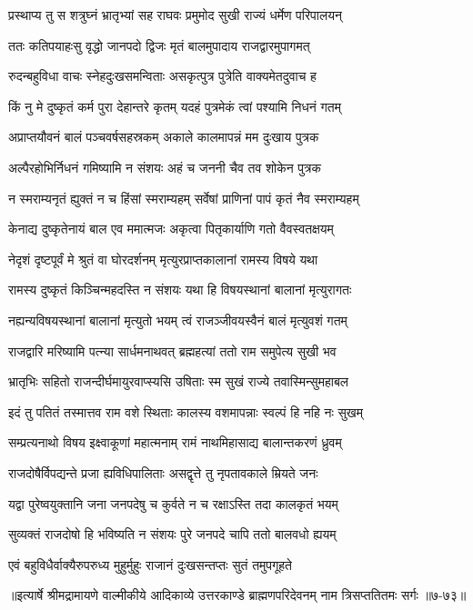 
\twolineshloka
{प्रस्थाप्य तु स शत्रुघ्नं भ्रातृभ्यां सह राघवः}
{प्रमुमोद सुखी राज्यं धर्मेण परिपालयन्} %

\twolineshloka
{ततः कतिपयाहःसु वृद्धो जानपदो द्विजः}
{मृतं बालमुपादाय राजद्वारमुपागमत्} %

\twolineshloka
{रुदन्बहुविधा वाचः स्नेहदुःखसमन्विताः}
{असकृत्पुत्र पुत्रेति वाक्यमेतदुवाच ह} %

\twolineshloka
{किं नु मे दुष्कृतं कर्म पुरा देहान्तरे कृतम्}
{यदहं पुत्रमेकं त्वां पश्यामि निधनं गतम्} %

\twolineshloka
{अप्राप्तयौवनं बालं पञ्चवर्षसहस्रकम्}
{अकाले कालमापन्नं मम दुःखाय पुत्रक} %

\twolineshloka
{अल्पैरहोभिर्निधनं गमिष्यामि न संशयः}
{अहं च जननी चैव तव शोकेन पुत्रक} %

\twolineshloka
{न स्मराम्यनृतं ह्युक्तं न च हिंसां स्मराम्यहम्}
{सर्वेषां प्राणिनां पापं कृतं नैव स्मराम्यहम्} %

\twolineshloka
{केनाद्य दुष्कृतेनायं बाल एव ममात्मजः}
{अकृत्वा पितृकार्याणि गतो वैवस्वतक्षयम्} %

\twolineshloka
{नेदृशं दृष्टपूर्वं मे श्रुतं वा घोरदर्शनम्}
{मृत्युरप्राप्तकालानां रामस्य विषये यथा} %

\twolineshloka
{रामस्य दुष्कृतं किञ्चिन्महदस्ति न संशयः}
{यथा हि विषयस्थानां बालानां मृत्युरागतः} %

\twolineshloka
{नह्यन्यविषयस्थानां बालानां मृत्युतो भयम्}
{त्वं राजञ्जीवयस्वैनं बालं मृत्युवशं गतम्} %

\twolineshloka
{राजद्वारि मरिष्यामि पत्न्या सार्धमनाथवत्}
{ब्रह्महत्यां ततो राम समुपेत्य सुखी भव} %

\twolineshloka
{भ्रातृभिः सहितो राजन्दीर्घमायुरवाप्स्यसि}
{उषिताः स्म सुखं राज्ये तवास्मिन्सुमहाबल} %

\twolineshloka
{इदं तु पतितं तस्मात्तव राम वशे स्थिताः}
{कालस्य वशमापन्नाः स्वल्पं हि नहि नः सुखम्} %

\twolineshloka
{सम्प्रत्यनाथो विषय इक्ष्वाकूणां महात्मनाम्}
{रामं नाथमिहासाद्य बालान्तकरणं ध्रुवम्} %

\twolineshloka
{राजदोषैर्विपद्यन्ते प्रजा ह्यविधिपालिताः}
{असद्वृत्ते तु नृपतावकाले म्रियते जनः} %

\twolineshloka
{यद्वा पुरेष्वयुक्तानि जना जनपदेषु च}
{कुर्वते न च रक्षाऽस्ति तदा कालकृतं भयम्} %

\twolineshloka
{सुव्यक्तं राजदोषो हि भविष्यति न संशयः}
{पुरे जनपदे चापि ततो बालवधो ह्ययम्} %

\twolineshloka
{एवं बहुविधैर्वाक्यैरुपरुध्य मुहुर्मुहुः}
{राजानं दुःखसन्तप्तः सुतं तमुपगूहते} %


॥इत्यार्षे श्रीमद्रामायणे वाल्मीकीये आदिकाव्ये उत्तरकाण्डे ब्राह्मणपरिदेवनम् नाम त्रिसप्ततितमः सर्गः ॥७-७३॥
